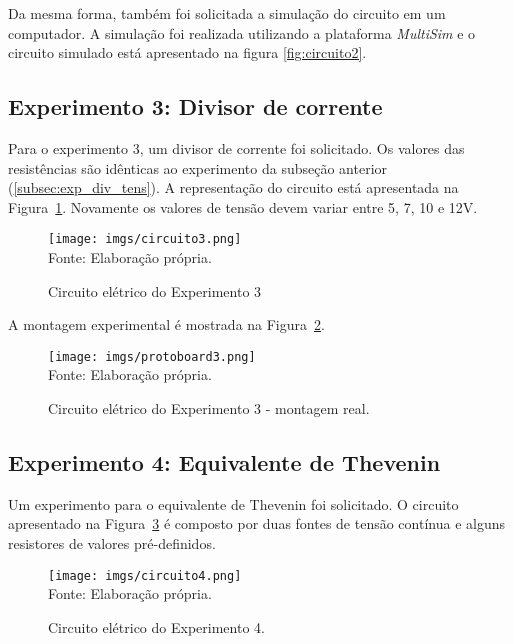\documentclass[a4paper,pra,aps,twocolumn,superscriptaddress,10pt,final]{revtex4-2}
\begin{document}
    Da mesma forma, também foi solicitada a simulação do circuito em um computador. A simulação foi realizada utilizando a plataforma \emph{MultiSim} e o circuito simulado está apresentado na figura \ref{fig:circuito2}.


\subsection{Experimento 3: Divisor de corrente}
\label{subsec:exp_div_corr}


    Para o experimento 3, um divisor de corrente foi solicitado. Os valores das resistências são idênticas ao experimento da subseção anterior (\ref{subsec:exp_div_tens}). A representação do circuito está apresentada na Figura~\ref{fig:circuito3}. Novamente os valores de tensão devem variar entre 5, 7, 10 e 12$\unit{\volt}$.

    \begin{figure}[H]
        \centering
        \caption{Circuito elétrico do Experimento 3}
        \texttt{[image: imgs/circuito3.png]}\\
        \scriptsize{Fonte: Elaboração própria.}
        \label{fig:circuito3}
    \end{figure}

    A montagem experimental é mostrada na Figura~\ref{fig:protoboard3}.

    \begin{figure}[H]
        \centering
        \caption{Circuito elétrico do Experimento 3 - montagem real.}
        \texttt{[image: imgs/protoboard3.png]}\\
        \scriptsize{Fonte: Elaboração própria.}
        \label{fig:protoboard3}
    \end{figure}

\subsection{Experimento 4: Equivalente de Thevenin}
\label{subsec:exp_equiv_the}

    Um experimento para o equivalente de Thevenin foi solicitado. O circuito apresentado na Figura~\ref{fig:circuito4} é composto por duas fontes de tensão contínua e alguns resistores de valores pré-definidos.

    \begin{figure}[H]
        \centering
        \caption{Circuito elétrico do Experimento 4.}
        \texttt{[image: imgs/circuito4.png]}\\
        \scriptsize{Fonte: Elaboração própria.}
        \label{fig:circuito4}
    \end{figure}
\end{document}
